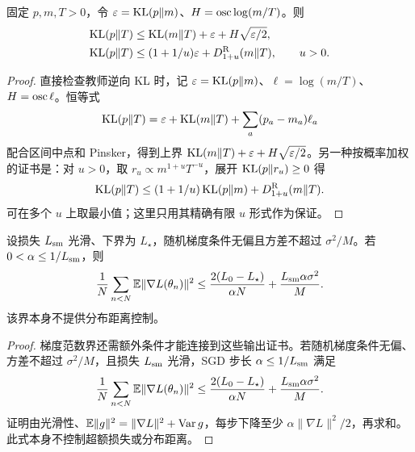 \begin{proposition}[有限拟合的教师 KL 证书]
固定 $p,m,T>0$，令 $\varepsilon=\operatorname{KL}(p\Vert m)$、$H=\operatorname{osc}\log(m/T)$。则
\begin{align}
\operatorname{KL}(p\Vert T)&\le\operatorname{KL}(m\Vert T)+\varepsilon+H\sqrt{\varepsilon/2},\\
\operatorname{KL}(p\Vert T)&\le(1+1/u)\varepsilon+D^{\rm R}_{1+u}(m\Vert T),\qquad u>0.
\end{align}
\end{proposition}
\begin{proof}
直接检查教师逆向 KL 时，记 $\varepsilon=\operatorname{KL}(p\Vert m)$、$\ell=\log(m/T)$、$H=\operatorname{osc}\ell$。恒等式
\begin{equation}
\operatorname{KL}(p\Vert T)=\varepsilon+\operatorname{KL}(m\Vert T)+\sum_a(p_a-m_a)\ell_a
\end{equation}
配合区间中点和 Pinsker，得到上界 $\operatorname{KL}(m\Vert T)+\varepsilon+H\sqrt{\varepsilon/2}$。另一种按概率加权的证书是：对 $u>0$，取 $r_u\propto m^{1+u}T^{-u}$，展开 $\operatorname{KL}(p\Vert r_u)\ge0$ 得
\begin{equation}
\operatorname{KL}(p\Vert T)
\le(1+1/u)\operatorname{KL}(p\Vert m)+D^{\rm R}_{1+u}(m\Vert T).
\end{equation}
可在多个 $u$ 上取最小值；这里只用其精确有限 $u$ 形式作为保证。
\end{proof}

\begin{proposition}
设损失 $L_{\rm sm}$ 光滑、下界为 $L_\star$，随机梯度条件无偏且方差不超过 $\sigma^2/M$。若 $0<\alpha\le1/L_{\rm sm}$，则
\begin{equation}
\frac1N\sum_{n<N}\mathbb E\|\nabla L(\theta_n)\|^2
\le\frac{2(L_0-L_\star)}{\alpha N}+\frac{L_{\rm sm}\alpha\sigma^2}{M}.
\end{equation}
该界本身不提供分布距离控制。
\end{proposition}
\begin{proof}
梯度范数界还需额外条件才能连接到这些输出证书。若随机梯度条件无偏、方差不超过 $\sigma^2/M$，且损失 $L_{\rm sm}$ 光滑，SGD 步长 $\alpha\le1/L_{\rm sm}$ 满足
\begin{equation}
\frac1N\sum_{n<N}\mathbb E\|\nabla L(\theta_n)\|^2
\le\frac{2(L_0-L_\star)}{\alpha N}+\frac{L_{\rm sm}\alpha\sigma^2}{M}.
\end{equation}
证明由光滑性、$\mathbb E\|g\|^2=\|\nabla L\|^2+\operatorname{Var} g$，每步下降至少 $\alpha\|\nabla L\|^2/2$，再求和。此式本身不控制超额损失或分布距离。
\end{proof}

